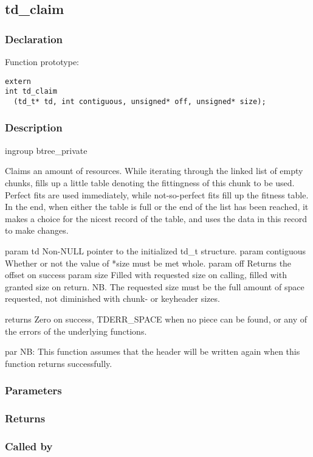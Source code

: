 
\newpage
\subsection{td\_claim}
\subsubsection{Declaration} Function prototype:

\begin{verbatim}
extern
int td_claim
  (td_t* td, int contiguous, unsigned* off, unsigned* size);
\end{verbatim}

\subsubsection{Description}


 ingroup btree\_private

 Claims an amount of resources.
 While iterating through the linked list
 of empty chunks, fills up a little table denoting the fittingness of
 this chunk to be used.  Perfect fits are used immediately, while
 not-so-perfect fits fill up the fitness table.  In the end, when either
 the table is full or the end of the list has been reached, it makes a
 choice for the nicest record of the table, and uses the data in this
 record to make changes.

 param td Non-NULL pointer to the initialized td\_t structure.
 param contiguous Whether or not the value of *size must be met whole.
 param off Returns the offset on success
 param size Filled with requested size on calling, filled with granted
 size on return.  NB. The requested size must be the full amount of space
 requested, not diminished with chunk- or keyheader sizes.

 returns Zero on success, TDERR\_SPACE when no piece can be found, or
 any of the errors of the underlying functions.

 par NB:
 This function assumes that the header will be written again
 when this function returns successfully.
 

\subsubsection{Parameters}
\subsubsection{Returns}
\subsubsection{Called by}
